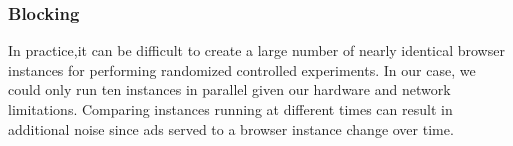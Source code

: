 \documentclass[10pt, onecolumn]{report}
\begin{document}

\subsubsection{Blocking}

In practice,it can be difficult to create a large number of nearly identical browser instances
for performing randomized controlled experiments. 
In our case, we could only run ten instances in parallel given our hardware 
and network limitations.  Comparing instances running at different times 
can result in additional noise since ads served to a browser instance change over time.
\end{document}

